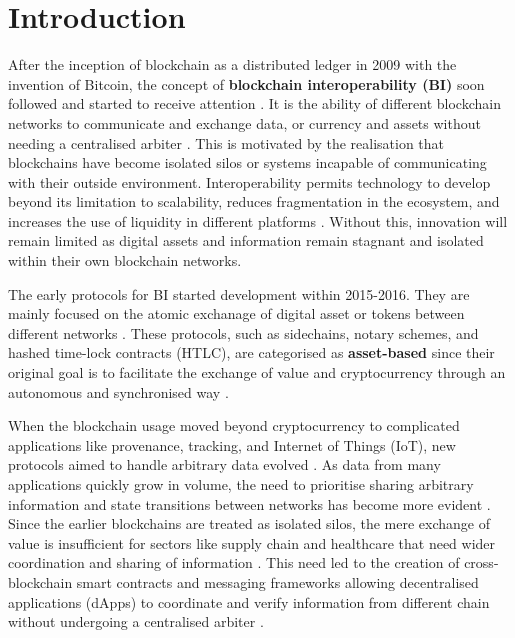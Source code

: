 \chapter{Introduction}\label{introduction}

After the inception of blockchain as a distributed ledger in 2009 with
the invention of Bitcoin, the concept of \textbf{blockchain
interoperability (BI)} soon followed and started to receive attention
\citep{Belchior_2021}. It is the ability of different blockchain
networks to communicate and exchange data, or currency and assets
without needing a centralised arbiter
\citep{kishore2025interoperability}. This is motivated by the
realisation that blockchains have become isolated silos or systems
incapable of communicating with their outside environment.
Interoperability permits technology to develop beyond its limitation to
scalability, reduces fragmentation in the ecosystem, and increases the
use of liquidity in different platforms \citep{belenkov2025review}
\citep{Saleh2024}. Without this, innovation will remain limited as
digital assets and information remain stagnant and isolated within their
own blockchain networks.

The early protocols for BI started development within 2015-2016. They
are mainly focused on the atomic exchanage of digital asset or tokens
between different networks
\citep{wilson2026exploringblockchaininteroperabilityframeworks}. These
protocols, such as sidechains, notary schemes, and hashed time-lock
contracts (HTLC), are categorised as \textbf{asset-based} since their
original goal is to facilitate the exchange of value and cryptocurrency
through an autonomous and synchronised way \citep{wang2021sok}.

When the blockchain usage moved beyond cryptocurrency to complicated
applications like provenance, tracking, and Internet of Things (IoT),
new protocols aimed to handle arbitrary data evolved \citep{Kotey_2024}.
As data from many applications quickly grow in volume, the need to
prioritise sharing arbitrary information and state transitions between
networks has become more evident \citep{wang2021sok}
\citep{kishore2025interoperability}. Since the earlier blockchains are
treated as isolated silos, the mere exchange of value is insufficient
for sectors like supply chain and healthcare that need wider
coordination and sharing of information
\citep{wilson2026exploringblockchaininteroperabilityframeworks}
\citep{madine2021appxchain}. This need led to the creation of
cross-blockchain smart contracts and messaging frameworks allowing
decentralised applications (dApps) to coordinate and verify information
from different chain without undergoing a centralised arbiter
\citep{Belchior_2021}.

